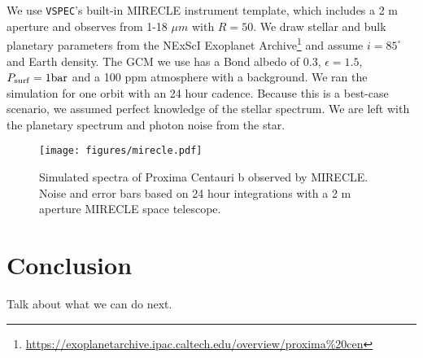 \documentclass[twocolumn]{aastex631}
\newcommand{\TJ}[1]{\textcolor{tedcommentcolor}{#1}}
\begin{document}
We use \texttt{VSPEC}'s built-in MIRECLE instrument template, which includes a 2 m aperture and observes from 1-18 $\mu m$ with $R=50$.
We draw stellar and bulk planetary parameters from the NExScI Exoplanet Archive\footnote{\url{https://exoplanetarchive.ipac.caltech.edu/overview/proxima\%20cen}}
and assume $i=85^\circ$ and Earth density. The GCM we use has a Bond albedo of 0.3, $\epsilon=1.5$, $P_{\rm surf} = 1 \text{bar}$ and a 100 ppm  atmosphere with a  background.
We ran the simulation for one orbit with an 24 hour cadence. Because this is a best-case scenario, we assumed perfect knowledge of the stellar spectrum.
We are left with the planetary spectrum and photon noise from the star.

\begin{figure}
    \centering
    \texttt{[image: figures/mirecle.pdf]}
    \caption{
        Simulated spectra of Proxima Centauri b observed by MIRECLE. Noise and error bars based on 24 hour integrations with a 2 m aperture MIRECLE
        space telescope.
        }
    \label{fig:mirecle}
\end{figure}

\section{Conclusion \label{sec:conclusion}}
\TJ{Talk about what we can do next.}


\end{document}
